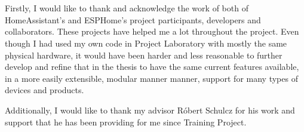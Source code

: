 \chapter*{\koszonetnyilvanitas}


Firstly, I would like to thank and acknowledge the work of both of HomeAssistant's and ESPHome's project participants, developers and collaborators. These projects have helped me a lot throughout the project. Even though I had used my own code in Project Laboratory with mostly the same physical hardware, it would have been harder and less reasonable to further develop and refine that in the thesis to have the same current features available, in a more easily extensible, modular manner manner, support for many types of devices and products. \break

Additionally, I would like to thank my advisor Róbert Schulcz for his work and support that he has been providing for me since Training Project.
